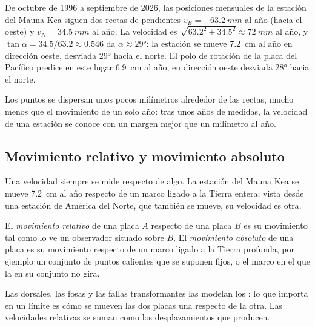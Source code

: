 \begin{example}\label{ex:g11:plate-motions:mkea}
De octubre de 1996 a septiembre de 2026, las posiciones mensuales de la
estación del Mauna Kea siguen dos rectas de pendientes $v_E =
\qty{-63.2}{mm}$ al año (hacia el oeste) y $v_N = \qty{+34.5}{mm}$ al año. La
velocidad es $\sqrt{63.2^2 + 34.5^2} \approx \qty{72}{mm}$ al año, y $\tan\alpha
= 34.5/63.2 \approx 0.546$ da $\alpha \approx \ang{29}$: la estación se mueve
\qty{7.2}{cm} al año en dirección oeste, desviada \ang{29} hacia el norte. El
polo de rotación de la placa del Pacífico predice en este lugar
\qty{6.9}{cm} al año, en dirección oeste desviada \ang{28} hacia el norte.
\end{example}

Los puntos se dispersan unos pocos milímetros alrededor de las rectas, mucho
menos que el movimiento de un solo año: tras unos años de medidas, la
velocidad de una estación se conoce con un margen mejor que un milímetro al año.

\subsection{Movimiento relativo y movimiento absoluto}

Una velocidad siempre se mide respecto de algo. La estación del Mauna Kea se
mueve \qty{7.2}{cm} al año respecto de un marco ligado a la Tierra entera;
vista desde una estación de América del Norte, que también se mueve, su
velocidad es otra.

\begin{definition}\label{def:g11:plate-motions:relative-motion}
El \emph{movimiento relativo} de una placa $A$
respecto de una placa $B$ es su movimiento tal como lo ve un observador
situado sobre $B$. El \emph{movimiento absoluto}
de una placa es su movimiento respecto de un marco ligado a la Tierra
profunda, por ejemplo un conjunto de puntos calientes que se suponen fijos, o
el marco en el que la  en su conjunto no gira.
\end{definition}

Las dorsales, las fosas y las fallas transformantes las modelan los
: lo que importa en un límite es cómo se mueven las dos
placas una respecto de la otra. Las velocidades relativas se suman como los
desplazamientos que producen.


